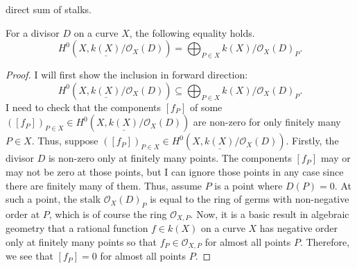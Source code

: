 direct sum of stalks.
\begin{lemm}
  For a divisor $D$ on a curve $X$, the following equality holds.
  \[
    H^{0}(X,\underline{k(X)}/\mathscr{O}_X(D))=\bigoplus_{P\in X}
    k(X)/\mathscr{O}_X(D)_{P}.
  \]
\end{lemm}
\begin{proof}
  I will first show the inclusion in forward direction:
  \[
    H^{0}(X,\underline{k(X)}/\mathscr{O}_X(D))\subseteq\bigoplus_{P\in X}
    k(X)/\mathscr{O}_X(D)_{P}.
  \]
  I need to check that the components $[f_{P}]$ of some
  $([f_{P}])_{P\in X}\in H^{0}(X,\underline{k(X)}/\mathscr{O}_X(D))$ are non-zero
  for only finitely many $P\in X$. Thus, suppose $([f_{P}])_{P\in X}\in
  H^{0}(X,\underline{k(X)}/\mathscr{O}_X(D))$. Firstly, the divisor $D$ is
  non-zero only at finitely many points. The components $[f_{P}]$ may or may
  not be zero at those points, but I can ignore those points in any case
  since there are finitely many of them. Thus, assume $P$ is a point where
  $D(P)=0$. At such a point, the stalk $\mathscr{O}_X(D)_{P}$ is equal to the
  ring of germs with non-negative order at $P$, which is of course the ring
  $\mathscr{O}_{X,P}$. Now, it is a basic result in algebraic geometry that
  a rational function $f\in k(X)$ on a curve $X$ has negative order only
  at finitely many points so that $f_{P}\in\mathscr{O}_{X,P}$ for almost
  all points $P$. Therefore, we see that $[f_{P}]=0$ for almost all points
  $P$.


\end{proof}
